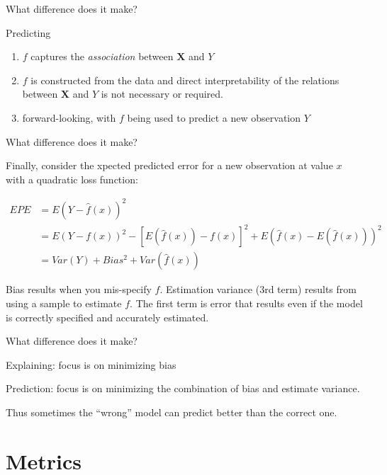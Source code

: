 \documentclass[10pt,ignorenonframetext,]{beamer}
\providecommand{\tightlist}{%
\setlength{\itemsep}{0pt}\setlength{\parskip}{0pt}}
\begin{document}
\begin{frame}{What difference does it make?}

Predicting

\begin{enumerate}[<+->]
\def\labelenumi{\arabic{enumi}.}
\tightlist
\item
  \(f\) captures the \emph{association} between \(\boldsymbol{X}\) and
  \(Y\)
\item
  \(f\) is constructed from the data and direct interpretability of the
  relations between \(\boldsymbol{X}\) and \(Y\) is not necessary or
  required.
\item
  forward-looking, with \(f\) being used to predict a new observation
  \(Y\)
\end{enumerate}

\end{frame}

\begin{frame}{What difference does it make?}

Finally, consider the xpected predicted error for a new observation at
value \(x\) with a quadratic loss function:

\begin{align}
EPE &= E(Y-\hat{f}(x))^2\\
    &= E(Y-f(x))^2 - [E(\hat{f}(x))-f(x)]^2 + E(\hat{f}(x)-E(\hat{f}(x)))^2\\
    &= Var(Y) + Bias^2 + Var(\hat{f}(x))
\end{align}

Bias results when you mis-specify \(f\). Estimation variance (3rd term)
results from using a sample to estimate \(f\). The first term is error
that results even if the model is correctly specified and accurately
estimated.

\end{frame}

\begin{frame}{What difference does it make?}

Explaining: focus is on minimizing bias

Prediction: focus is on minimizing the combination of bias and estimate
variance.

Thus sometimes the ``wrong'' model can predict better than the correct
one.

\end{frame}

\section{Metrics}\label{metrics}
\end{document}
